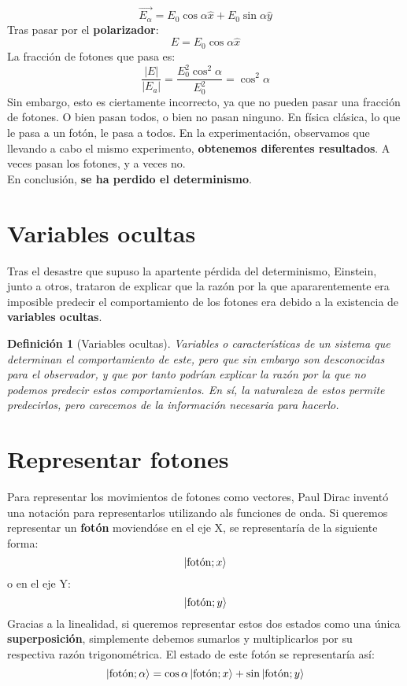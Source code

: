 \documentclass{article}
\newtheorem*{vars*}{Definición}
\begin{document}
\[
    \vec{E_\alpha}=E_0 \cos \alpha \hat{x} + E_0 \sin \alpha \hat{y}
\]
Tras pasar por el \textbf{polarizador}:
\[
    E=E_0 \cos \alpha \hat{x}
\]
La fracción de fotones que pasa es:
\[
    \frac{|E|}{|E_a|}=\frac{E_0^2\cos^2 \alpha}{E_0^2}=\cos^2 \alpha  
\]
Sin embargo, esto es ciertamente incorrecto, ya que no pueden pasar una fracción de fotones. O bien pasan todos, o bien no pasan ninguno. En física clásica, lo que le pasa a un fotón, le pasa a todos.
En la experimentación, observamos que llevando a cabo el mismo experimento, \textbf{obtenemos diferentes resultados}. A veces pasan los fotones, y a veces no.\\
En conclusión, \textbf{se ha perdido el determinismo}.

\section*{Variables ocultas}
Tras el desastre que supuso la apartente pérdida del determinismo, Einstein, junto a otros, trataron de explicar que la razón por la que apararentemente
era imposible predecir el comportamiento de los fotones era debido a la existencia de \textbf{variables ocultas}.
\begin{vars*}[Variables ocultas]
    Variables o características de un sistema que determinan el comportamiento de este, pero que sin embargo son desconocidas para el observador,
    y que por tanto podrían explicar la razón por la que no podemos predecir estos comportamientos. En sí, la naturaleza de estos permite predecirlos,
    pero carecemos de la información necesaria para hacerlo.
\end{vars*}

\section*{Representar fotones}
Para representar los movimientos de fotones como vectores, Paul Dirac inventó una notación para representarlos utilizando als funciones de onda. Si
queremos representar un \textbf{fotón} moviendóse en el eje $\mathrm{X}$, se representaría de la siguiente forma:
\[
     \ket{\text{fotón}; x}
\]
o en el eje $\mathrm{Y}$:
\[
    \ket{\text{fotón}; y}
\]
Gracias a la linealidad, si queremos representar estos dos estados como una única \textbf{superposición}, simplemente debemos sumarlos y multiplicarlos
por su respectiva razón trigonométrica. El estado de este fotón se representaría así:
\[
    \ket{\text{fotón}; \alpha}= \cos \alpha \ket{\text{fotón}; x}+\sin \ket{\text{fotón}; y}
\]
\pagebreak
\end{document}
